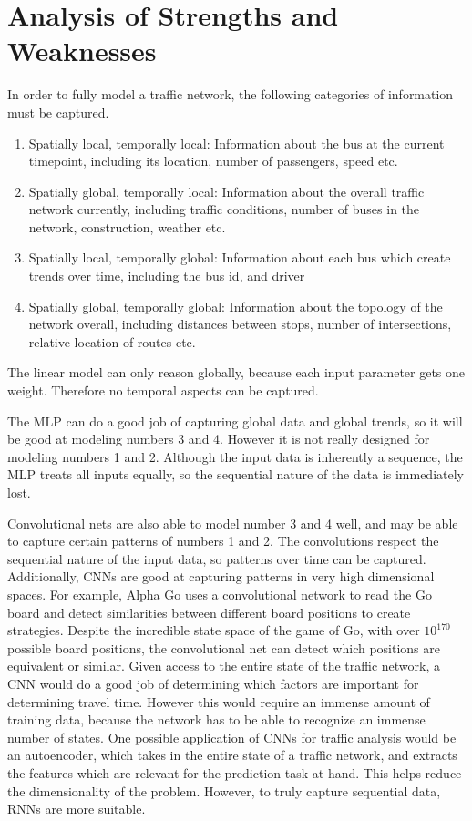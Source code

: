 \section{Analysis of Strengths and Weaknesses}

In order to fully model a traffic network, the following categories of information must be captured.

\begin{enumerate}
\item Spatially local, temporally local: Information about the bus at the current timepoint, including its location, number of passengers, speed etc.
\item Spatially global, temporally local: Information about the overall traffic network currently, including traffic conditions, number of buses in the network, construction, weather etc.
\item Spatially local, temporally global: Information about each bus which create trends over time, including the bus id, and driver
\item Spatially global, temporally global: Information about the topology of the network overall, including distances between stops, number of intersections, relative location of routes etc.
\end{enumerate}

The linear model can only reason globally, because each input parameter gets one weight.
Therefore no temporal aspects can be captured.

The MLP can do a good job of capturing global data and global trends, so it will be good at modeling numbers 3 and 4.
However it is not really designed for modeling numbers 1 and 2.
Although the input data is inherently a sequence, the MLP treats all inputs equally, so the sequential nature of the data is immediately lost.

Convolutional nets are also able to model number 3 and 4 well, and may be able to capture certain patterns of numbers 1 and 2.
The convolutions respect the sequential nature of the input data, so patterns over time can be captured.
Additionally, CNNs are good at capturing patterns in very high dimensional spaces.
For example, Alpha Go \cite{silver2016mastering} uses a convolutional network to read the Go board and detect similarities between different board positions to create strategies.
Despite the incredible state space of the game of Go, with over $10^170$ possible board positions, the convolutional net can detect which positions are equivalent or similar.
Given access to the entire state of the traffic network, a CNN would do a good job of determining which factors are important for determining travel time.
However this would require an immense amount of training data, because the network has to be able to recognize an immense number of states.
One possible application of CNNs for traffic analysis would be an autoencoder, which takes in the entire state of a traffic network, and extracts the features which are relevant for the prediction task at hand.
This helps reduce the dimensionality of the problem.
However, to truly capture sequential data, RNNs are more suitable.

